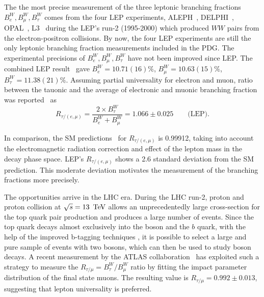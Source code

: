 The the most precise measurement of the three \PW leptonic branching fractions $B^W_e, B^W_\mu, B^W_\tau$ comes from the four LEP experiments, ALEPH~\cite{Heister:2004wr}, DELPHI~\cite{Abdallah:2003zm}, OPAL~\cite{Abbiendi:2007rs}, L3~\cite{Achard:2004zw} during the LEP's run-2 (1995-2000) which produced $WW$ pairs from the electron-positron collisions. By now, the four LEP experiments are still the only \PW leptonic branching fraction measurements included in the PDG. The experimental precisions of $B^W_e, B^W_\mu, B^W_\tau$ have not been improved since LEP. The combined LEP result~\cite{Schael:2013ita} gave $B^W_e = 10.71(16)\%$, $B^W_\mu = 10.63(15)\%$, $B^W_\tau = 11.38(21)\%$. Assuming partial universality for electron and muon, ratio between the tauonic and the average of electronic and muonic branching fraction was reported~\cite{Schael:2013ita} as
\begin{equation*}
    R_{\tau/(e,\mu)} = \frac{2\times B^W_\tau }{B^W_e +  B^W_\mu} = 1.066 \pm 0.025 \qquad \text{(LEP)}.
\end{equation*}

\noindent In comparison, the SM predictions~\cite{Denner:1991kt,Rtau,dEnterria:2016rbf} for $R_{\tau/(e,\mu)}$ is 0.99912,  
taking into account the electromagnetic radiation correction and effect of the lepton mass in the \PW decay phase space. LEP's $R_{\tau/(e,\mu)}$ shows a 2.6 standard deviation from the SM prediction. This moderate deviation motivates the measurement of the branching fractions more precisely.





The opportunities arrive in the LHC era. During the LHC run-2, proton and proton collision at $\sqrt{s}=13~\,\text{Te\hspace{-.08em}V}$ allows an unprecedentedly large cross-section for the top quark pair production and produces a large number of \ttbar events. Since the top quark decays almost exclusively into the \PW boson and the $b$ quark, with the help of the improved b-tagging techniques \cite{Chatrchyan:2012jua, Sirunyan:2017ezt, Bols:2020bkb}, it is possible to select a large and pure sample of \ttbar events with two \PW bosons, which can then be used to study \PW boson decays. A recent measurement by the ATLAS collaboration~\cite{Aad:2020ayz} has exploited such a strategy to measure the $R_{\tau/\mu}=B^W_\tau/B^W_\mu$ ratio by fitting the impact parameter distribution of the final state muons. The resulting value is $R_{\tau/\mu} = 0.992 \pm 0.013$, suggesting that lepton universality is preferred. 


